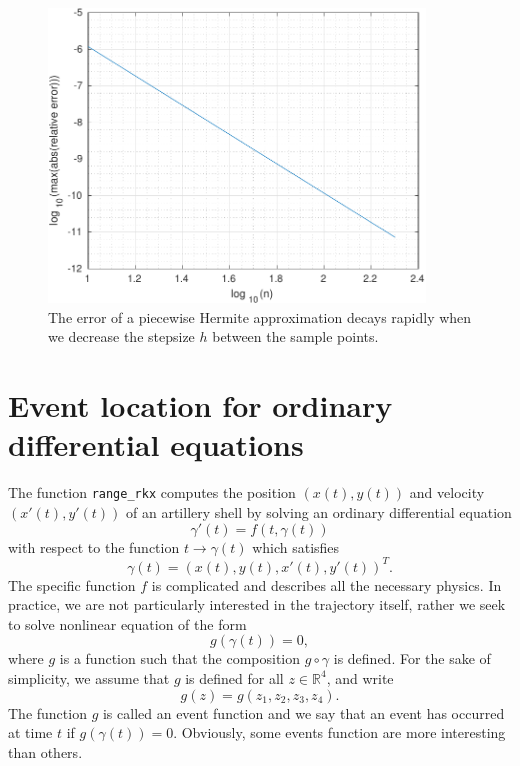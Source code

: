 \documentclass[a4paper,12pt]{article}
\newcommand{\R}{\mathbb{R}}
\newcommand{\bes}{\begin{equation*}}
\newcommand{\ees}{\end{equation*}}
\begin{document}
 \begin{figure}
    \centering
    \includegraphics[width=10cm]{MyPiecewiseHermite.pdf} \caption[The error of the piecewise Hermite approximation]{The error of a piecewise Hermite approximation decays rapidly when we decrease the stepsize $h$ between the sample points.} \label{fig:MyPiecewiseHermite}
    \end{figure}

 
   \section{Event location for ordinary differential equations}

   The function {\tt range\_rkx} computes the position $(x(t),y(t))$ and velocity $(x'(t),y'(t))$ of an artillery shell by solving an ordinary differential equation
   \bes
   \gamma'(t) = f(t,\gamma(t))
   \ees
   with respect to the function $t \rightarrow \gamma(t)$ which satisfies
   \bes
   \gamma(t) = (x(t), y(t), x'(t), y'(t))^T.
   \ees
   The specific function $f$ is complicated and describes all the necessary physics. In practice, we are not particularly interested in the trajectory itself, rather we seek to solve nonlinear equation of the form
   \bes
   g(\gamma(t)) = 0,
   \ees
   where $g$ is a function such that the composition $g \circ \gamma$ is defined. For the sake of simplicity, we assume that $g$ is defined for all $z \in \R^4$, and write
   \bes
   g(z) = g(z_1, z_2, z_3, z_4).
   \ees
   The function $g$ is called an event function and we say that an event has occurred at time $t$ if $g(\gamma(t)) = 0$. Obviously, some events function are more interesting than others.
   
\end{document}
